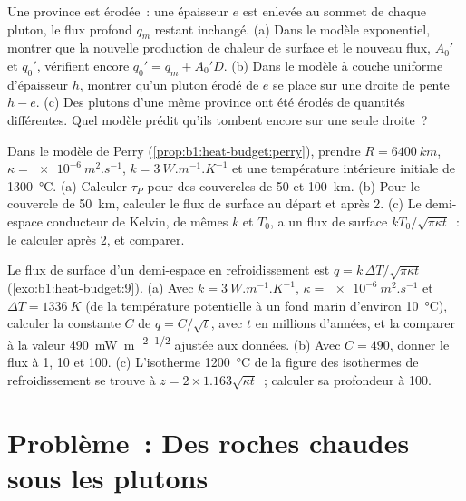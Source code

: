 \begin{exercise}[$\star\star\star$]\label{exo:b1:heat-budget:10}
Une province est érodée~: une épaisseur $e$ est enlevée au sommet de chaque
pluton, le flux profond $q_m$ restant inchangé. (a) Dans le modèle exponentiel,
montrer que la nouvelle production de chaleur de surface et le nouveau flux,
$A_0'$ et $q_0'$, vérifient encore $q_0' = q_m + A_0'D$. (b) Dans le modèle à
couche uniforme d'épaisseur $h$, montrer qu'un pluton érodé de $e$ se place sur
une droite de pente $h - e$. (c) Des plutons d'une même province ont été érodés de
quantités différentes. Quel modèle prédit qu'ils tombent encore sur une seule
droite~?
\end{exercise}

\begin{exercise}[$\star\star\star$]\label{exo:b1:heat-budget:11}
Dans le modèle de Perry (\cref{prop:b1:heat-budget:perry}), prendre $R = \qty{6400}{km}$,
$\kappa = \qty{e-6}{m^2.s^{-1}}$, $k = \qty{3}{W.m^{-1}.K^{-1}}$ et une température
intérieure initiale de \qty{1300}{\degreeCelsius}. (a) Calculer $\tau_P$ pour des
couvercles de 50 et \qty{100}{km}. (b) Pour le couvercle de \qty{50}{km}, calculer le
flux de surface au départ et après \qty{2}{\Ga}. (c) Le demi-espace conducteur
de Kelvin, de mêmes $k$ et $T_0$, a un flux de surface
$kT_0/\sqrt{\pi\kappa t}$~: le calculer après \qty{2}{\Ga}, et comparer.
\end{exercise}

\begin{exercise}[$\star\star\star$]\label{exo:b1:heat-budget:12}
Le flux de surface d'un demi-espace en refroidissement est $q = k\,\Delta T/\sqrt{\pi\kappa t}$
(\cref{exo:b1:heat-budget:9}). (a) Avec $k = \qty{3}{W.m^{-1}.K^{-1}}$, $\kappa =
\qty{e-6}{m^2.s^{-1}}$ et $\Delta T = \qty{1336}{K}$ (de la température
potentielle à un fond marin d'environ \qty{10}{\degreeCelsius}), calculer la
constante $C$ de $q = C/\sqrt t$, avec $t$ en millions d'années, et la comparer
à la valeur \qty{490}{mW.m^{-2}.\Ma^{1/2}} ajustée aux données. (b) Avec
$C = 490$, donner le flux à 1, 10 et \qty{100}{\Ma}. (c) L'isotherme
\qty{1200}{\degreeCelsius} de la figure des isothermes de refroidissement se
trouve à $z = 2\times1.163\sqrt{\kappa t}$~; calculer sa profondeur à \qty{100}{\Ma}.
\end{exercise}

\section{Problème~: Des roches chaudes sous les plutons}

